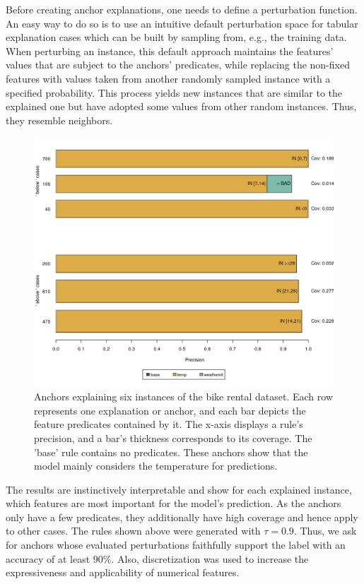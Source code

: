 \documentclass[12pt,]{krantz}
\begin{document}
Before creating anchor explanations, one needs to define a perturbation
function. An easy way to do so is to use an intuitive default
perturbation space for tabular explanation cases which can be built by
sampling from, e.g., the training data. When perturbing an instance,
this default approach maintains the features' values that are subject to
the anchors' predicates, while replacing the non-fixed features with
values taken from another randomly sampled instance with a specified
probability. This process yields new instances that are similar to the
explained one but have adopted some values from other random instances.
Thus, they resemble neighbors.

\begin{figure}

{\centering \includegraphics[width=\textwidth]{images/unnamed-chunk-33-1} 

}

\caption{Anchors explaining six instances of the bike rental dataset. Each row represents one explanation or anchor, and each bar depicts the feature predicates contained by it. The x-axis displays a rule's precision, and a bar's thickness corresponds to its coverage. The 'base' rule contains no predicates. These anchors show that the model mainly considers the temperature for predictions.}\label{fig:unnamed-chunk-33}
\end{figure}

The results are instinctively interpretable and show for each explained
instance, which features are most important for the model's prediction.
As the anchors only have a few predicates, they additionally have high
coverage and hence apply to other cases. The rules shown above were
generated with \(\tau = 0.9\). Thus, we ask for anchors whose evaluated
perturbations faithfully support the label with an accuracy of at least
\(90\%\). Also, discretization was used to increase the expressiveness
and applicability of numerical features.
\end{document}
